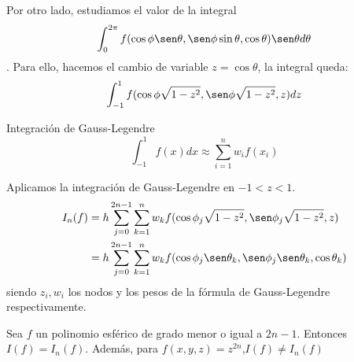 Por otro lado, estudiamos el valor de la integral $$\int_{0}^{2\pi} f(\cos\phi \sen\theta,\sen\phi \sin\theta,\cos\theta)\sen\theta d\theta$$. Para ello, hacemos el cambio de variable $z= \cos\theta$, la integral queda:
$$
\int_{-1}^{1} f(\cos\phi\sqrt{1-z^2},\sen \phi\sqrt{1-z^2},z) dz 
$$
\begin{rem}Integración de Gauss-Legendre
	$$
	\int_{-1}^{1}f(x)dx \approx \sum_{i=1}^{n} w_if(x_i)
	$$
\end{rem}
Aplicamos la integración de Gauss-Legendre en $-1<z<1$.
\begin{gather}\label{gaussian_quadrature}
\begin{aligned}
I_n(f) &= h \sum_{j=0}^{2n-1} \sum_{k=1}^{n} w_k f(\cos \phi_j\sqrt{1-z^2}, \sen\phi_j\sqrt{1-z^2},z) \\ &= h \sum_{j=0}^{2n-1} \sum_{k=1}^{n} w_k f(\cos \phi_j\sen\theta_k, \sen\phi_j\sen\theta_k,\cos\theta_k)
\end{aligned}
\end{gather}
siendo ${z_i},{w_i}$ los nodos y los pesos de la fórmula de Gauss-Legendre respectivamente.
\begin{thm}Sea $f$ un polinomio esférico de grado menor o igual a $2n-1$. Entonces $I(f)=I_n(f)$. Además, para $f(x,y,z) = z^{2n}$,$I(f)\neq I_n(f)$
 	
\end{thm}
